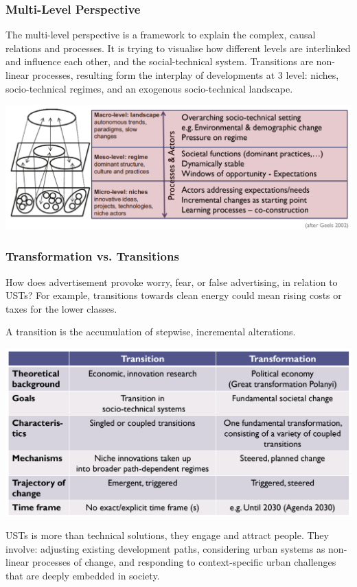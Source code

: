 \documentclass{article}
\begin{document}
\subsubsection{Multi-Level Perspective}

The multi-level perspective is a framework to explain the complex, causal relations and processes. It is trying to visualise how different levels are interlinked and influence each other, and the social-technical system. Transitions are non-linear processes, resulting form the interplay of developments at 3 level: niches, socio-technical regimes, and an exogenous socio-technical landscape.

\includegraphics[width=\textwidth]{multi_level_perspective}

\subsubsection{Transformation vs. Transitions}

How does advertisement provoke worry, fear, or false advertising, in relation to USTs? For example, transitions towards clean energy could mean rising costs or taxes for the lower classes.

A transition is the accumulation of stepwise, incremental alterations. 

\includegraphics[width=\textwidth]{transformation_vs_transition}

USTs is more than technical solutions, they engage and attract people. They involve: adjusting existing development paths, considering urban systems as non-linear processes of change, and responding to context-specific urban challenges that are deeply embedded in society. 
\end{document}
